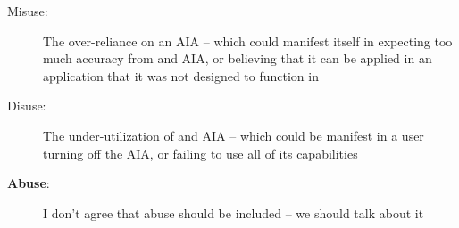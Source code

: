     \begin{description}
        \item [Misuse:] The over-reliance on an AIA -- which could manifest itself in expecting too much accuracy from and AIA, or believing that it can be applied in an application that it was not designed to function in
        \item [Disuse:] The under-utilization of and AIA -- which could be manifest in a user turning off the AIA, or failing to use all of its capabilities 
        \item [\textbf{Abuse}:] I don't agree that abuse should be included -- we should talk about it
    \end{description}

